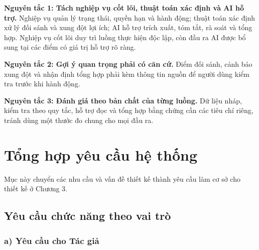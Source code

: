 \textbf{Nguyên tắc 1: Tách nghiệp vụ cốt lõi, thuật toán xác định và AI hỗ trợ.} Nghiệp vụ quản lý trạng thái, quyền hạn và hành động; thuật toán xác định xử lý đối sánh và xung đột lợi ích; AI hỗ trợ trích xuất, tóm tắt, rà soát và tổng hợp. Nghiệp vụ cốt lõi duy trì luồng thực hiện độc lập, còn đầu ra AI được bổ sung tại các điểm có giá trị hỗ trợ rõ ràng.

\textbf{Nguyên tắc 2: Gợi ý quan trọng phải có căn cứ.} Điểm đối sánh, cảnh báo xung đột và nhận định tổng hợp phải kèm thông tin nguồn để người dùng kiểm tra trước khi hành động.

\textbf{Nguyên tắc 3: Đánh giá theo bản chất của từng luồng.} Dữ liệu nháp, kiểm tra theo quy tắc, hỗ trợ đọc và tổng hợp bằng chứng cần các tiêu chí riêng, tránh dùng một thước đo chung cho mọi đầu ra.

\section{Tổng hợp yêu cầu hệ thống}

Mục này chuyển các nhu cầu và vấn đề thiết kế thành yêu cầu làm cơ sở cho thiết kế ở Chương 3.

\subsection{Yêu cầu chức năng theo vai trò}

\subsubsection{a) Yêu cầu cho Tác giả}

